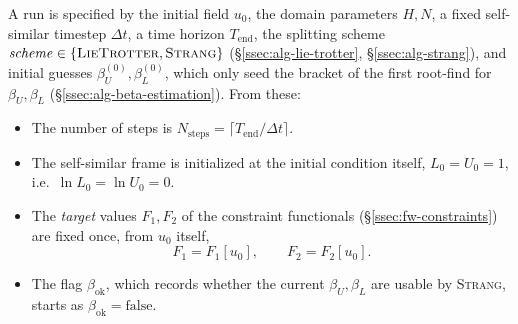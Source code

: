 A run is specified by the initial field $u_0$, the domain parameters $H, N$, a
fixed self-similar timestep $\Delta t$, a time horizon $T_{\mathrm{end}}$, the
splitting scheme
$\mathit{scheme} \in \{\textsc{LieTrotter}, \textsc{Strang}\}$
(\S\ref{ssec:alg-lie-trotter}, \S\ref{ssec:alg-strang}), and initial guesses
$\beta_U^{(0)}, \beta_L^{(0)}$, which only seed the bracket of the first
root-find for $\beta_U, \beta_L$ (\S\ref{ssec:alg-beta-estimation}). From these:
\begin{itemize}
  \item The number of steps is $N_{\mathrm{steps}} = \lceil T_{\mathrm{end}}/\Delta t \rceil$.
  \item The self-similar frame is initialized at the initial condition itself,
  $L_0 = U_0 = 1$, i.e.\ $\ln L_0 = \ln U_0 = 0$.
  \item The \emph{target} values $F_1, F_2$ of the constraint functionals
  (\S\ref{ssec:fw-constraints}) are fixed once, from $u_0$ itself,
  \begin{equation}\label{eq:alg-targets}
    F_1 = F_1[u_0], \qquad F_2 = F_2[u_0].
  \end{equation}
  \item The flag $\beta_{\mathrm{ok}}$, which records whether the current
  $\beta_U, \beta_L$ are usable by \textsc{Strang}, starts as
  $\beta_{\mathrm{ok}} = \text{false}$.
\end{itemize}

